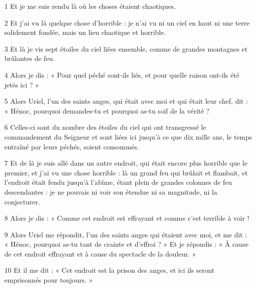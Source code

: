 \par 1 Et je me suis rendu là où les choses étaient chaotiques.
\par 2 Et j'ai vu là quelque chose d'horrible : je n'ai vu ni un ciel en haut ni une terre solidement fondée, mais un lieu chaotique et horrible.
\par 3 Et là je vis sept étoiles du ciel liées ensemble, comme de grandes montagnes et brûlantes de feu.
\par 4 Alors je dis : « Pour quel péché sont-ils liés, et pour quelle raison ont-ils été jetés ici ? »
\par 5 Alors Uriel, l'un des saints anges, qui était avec moi et qui était leur chef, dit : « Hénoc, pourquoi demandes-tu et pourquoi as-tu soif de la vérité ?
\par 6 Celles-ci sont du nombre des étoiles du ciel qui ont transgressé le commandement du Seigneur et sont liées ici jusqu'à ce que dix mille ans, le temps entraîné par leurs péchés, soient consommés.
\par 7 Et de là je suis allé dans un autre endroit, qui était encore plus horrible que le premier, et j'ai vu une chose horrible : là un grand feu qui brûlait et flambait, et l'endroit était fendu jusqu'à l'abîme, étant plein de grandes colonnes de feu descendantes : je ne pouvais ni voir son étendue ni sa magnitude, ni la conjecturer.
\par 8 Alors je dis : « Comme cet endroit est effrayant et comme c'est terrible à voir !
\par 9 Alors Uriel me répondit, l'un des saints anges qui étaient avec moi, et me dit : « Hénoc, pourquoi as-tu tant de crainte et d'effroi ? » Et je répondis : « À cause de cet endroit effrayant et à cause du spectacle de la douleur. »
\par 10 Et il me dit : « Cet endroit est la prison des anges, et ici ils seront emprisonnés pour toujours. »


